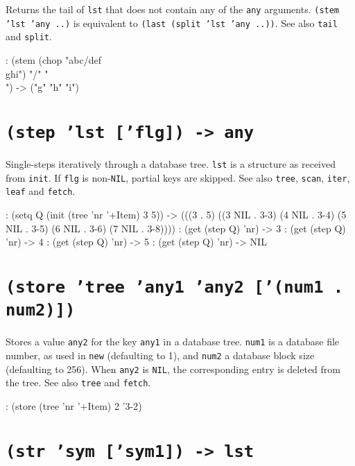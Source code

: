 Returns the tail of \texttt{lst} that does not contain any of the \texttt{any}
arguments. \texttt{(stem 'lst 'any ..)} is equivalent to
\texttt{(last (split 'lst 'any ..))}. See also \texttt{tail} and \texttt{split}.


\begin{wideverbatim}
: (stem (chop "abc/def\\ghi") "/" "\\")
-> ("g" "h" "i")
\end{wideverbatim}

 
\section*{\texttt{(step 'lst ['flg]) -> any}}
\label{sec:func-ref-S-(step 'lst ['flg]) -> any}


Single-steps iteratively through a database tree. \texttt{lst} is a structure
as received from \texttt{init}. If \texttt{flg} is non-\texttt{NIL}, partial keys are
skipped. See also \texttt{tree}, \texttt{scan}, \texttt{iter}, \texttt{leaf} and \texttt{fetch}.


\begin{wideverbatim}
: (setq Q (init (tree 'nr '+Item) 3 5))
-> (((3 . 5) ((3 NIL . {3-3}) (4 NIL . {3-4}) (5 NIL . {3-5})
      (6 NIL . {3-6}) (7 NIL . {3-8}))))
: (get (step Q) 'nr)
-> 3
: (get (step Q) 'nr)
-> 4
: (get (step Q) 'nr)
-> 5
: (get (step Q) 'nr)
-> NIL
\end{wideverbatim}

 
\section*{\texttt{(store 'tree 'any1 'any2 ['(num1 . num2)])}}
\label{sec:func-ref-S-(store 'tree 'any1 'any2 ['(num1 . num2)])}


Stores a value \texttt{any2} for the key \texttt{any1} in a database tree. \texttt{num1} is a
database file number, as used in \texttt{new} (defaulting to 1), and \texttt{num2} a
database block size (defaulting to 256). When \texttt{any2} is \texttt{NIL}, the
corresponding entry is deleted from the tree. See also \texttt{tree} and
\texttt{fetch}.


\begin{wideverbatim}
: (store (tree 'nr '+Item) 2 '{3-2})
\end{wideverbatim}

 
\section*{\texttt{(str 'sym ['sym1]) -> lst}}
\label{sec:func-ref-S-(str 'sym ['sym1]) -> lst}


